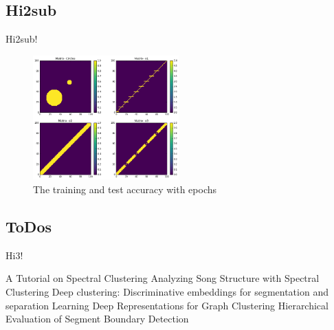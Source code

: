 \documentclass[final]{siamltexmm}
\begin{document}
\subsection{Hi2sub}
Hi2sub!

\begin{figure}[H]
  \centering
    \includegraphics[width=0.5\textwidth]{./figure/similarityMatrix.png}
  \caption{The training and test accuracy with epochs}
\end{figure}


\subsection{ToDos}
Hi3!

\begin{thebibliography}{10}
 {\sc A Tutorial on Spectral Clustering}
 {\sc Analyzing Song Structure with Spectral Clustering}
 {\sc Deep clustering: Discriminative embeddings for
segmentation and separation}
 {\sc Learning Deep Representations for Graph Clustering}
 {\sc Hierarchical Evaluation of Segment Boundary Detection}
\end{thebibliography}
\end{document}
